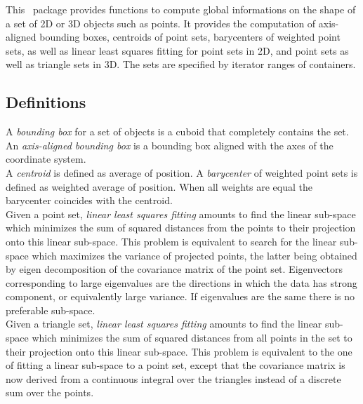 This \cgal\ package provides functions to compute global informations
on the shape of a set of 2D or 3D objects such as points. It provides the computation of axis-aligned bounding boxes, centroids of point sets, barycenters of weighted point sets, as well as linear least squares fitting for point sets in 2D, and point sets as well as triangle sets in 3D. The sets are specified by iterator ranges of containers.\\

\subsection*{Definitions}

A \emph{bounding box} for a set of objects is a cuboid that completely
contains the set. An \emph{axis-aligned bounding box} is a bounding box
aligned with the axes of the coordinate system.\\

A \emph{centroid} is defined as average of position. A \emph{barycenter} of weighted point sets is defined as weighted average of position. When all weights are equal the barycenter coincides with the centroid.\\

Given a point set, \emph{linear least squares fitting} amounts to
find the linear sub-space which minimizes the sum of squared
distances from the points to their projection onto this linear
sub-space. This problem is equivalent to search for the linear
sub-space which maximizes the variance of projected points, the latter
being obtained by eigen decomposition of the covariance
matrix of the point set. Eigenvectors corresponding to large eigenvalues are the
directions in which the data has strong component, or equivalently
large variance. If eigenvalues are the same there is no preferable
sub-space.\\

Given a triangle set, \emph{linear least squares fitting} amounts to find the linear sub-space which minimizes the sum of squared
distances from all points in the set to their projection onto this linear
sub-space. This problem is equivalent to the one of fitting a linear sub-space to a point set, except that the covariance matrix is now derived from a continuous integral over the triangles instead of a discrete sum over the points.



